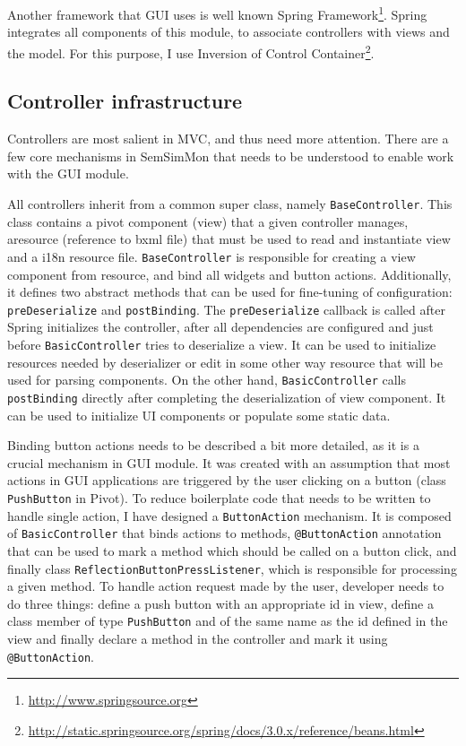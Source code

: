 Another framework that GUI uses is well known Spring Framework\footnote{\url{http://www.springsource.org}}. Spring integrates all components of this module, to associate controllers with views and the model. For this purpose, I use Inversion of Control Container\footnote{\url{http://static.springsource.org/spring/docs/3.0.x/reference/beans.html}}. 

\subsection{Controller infrastructure}

Controllers are most salient in MVC, and thus need more attention. There are a few core mechanisms in SemSimMon that needs to be understood to enable work with the GUI module.

All controllers inherit from a common super class, namely \texttt{BaseController}. This class contains a pivot component (view) that a given controller manages, aresource (reference to bxml file) that must be used to read and instantiate view and a i18n resource file. \texttt{BaseController} is responsible for creating a view component from resource, and bind all widgets and button actions. Additionally, it defines two abstract methods that can be used for fine-tuning of configuration: \texttt{preDeserialize} and \texttt{postBinding}. The \texttt{preDeserialize} callback is called after Spring initializes the controller, after all dependencies are configured and just before \texttt{BasicController} tries to deserialize a view. It can be used to initialize resources needed by deserializer or edit in some other way resource that will be used for parsing components. On the other hand, \texttt{BasicController} calls \texttt{postBinding} directly after completing the deserialization of view component. It can be used to initialize UI components or populate some static data.

Binding button actions needs to be described a bit more detailed, as it is a crucial mechanism in GUI module. It was created with an assumption that most actions in GUI applications are triggered by the user clicking on a button (class \texttt{PushButton} in Pivot). To reduce boilerplate code that needs to be written to handle single action, I have designed a \texttt{ButtonAction} mechanism. It is composed of \texttt{BasicController} that binds actions to methods, \texttt{@ButtonAction} annotation that can be used to mark a method which should be called on a button click, and finally class \texttt{ReflectionButtonPressListener}, which is responsible for processing a given method. To handle action request made by the user, developer needs to do three things: define a push button with an appropriate id in view, define a class member of type \texttt{PushButton} and of the same name as the id defined in the view and finally declare a method in the controller and mark it using \texttt{@ButtonAction}.

